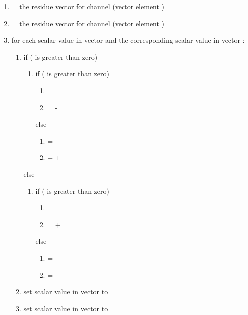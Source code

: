 \begin{enumerate}
 \item {} = the residue vector for channel
(vector  element \varname{[i]})
 \item {} = the residue vector for channel (vector
 element \varname{[i]})
 \item for each scalar value \varname{[M]} in vector  and the corresponding scalar value \varname{[A]} in vector :
  \begin{enumerate}
   \item if (\varname{[M]} is greater than zero)
    \begin{enumerate}
     \item if (\varname{[A]} is greater than zero)
      \begin{enumerate}
       \item \varname{[new\_M]} = \varname{[M]}
       \item \varname{[new\_A]} = \varname{[M]}-\varname{[A]}
      \end{enumerate}
     else
      \begin{enumerate}
       \item \varname{[new\_A]} = \varname{[M]}
       \item \varname{[new\_M]} = \varname{[M]}+\varname{[A]}
      \end{enumerate}

    \end{enumerate}
   else
    \begin{enumerate}
     \item if (\varname{[A]} is greater than zero)
      \begin{enumerate}
       \item \varname{[new\_M]} = \varname{[M]}
       \item \varname{[new\_A]} = \varname{[M]}+\varname{[A]}
      \end{enumerate}
     else
      \begin{enumerate}
       \item \varname{[new\_A]} = \varname{[M]}
       \item \varname{[new\_M]} = \varname{[M]}-\varname{[A]}
      \end{enumerate}

    \end{enumerate}

   \item set scalar value \varname{[M]} in vector  to \varname{[new\_M]}
   \item set scalar value \varname{[A]} in vector  to \varname{[new\_A]}
  \end{enumerate}

\end{enumerate}




